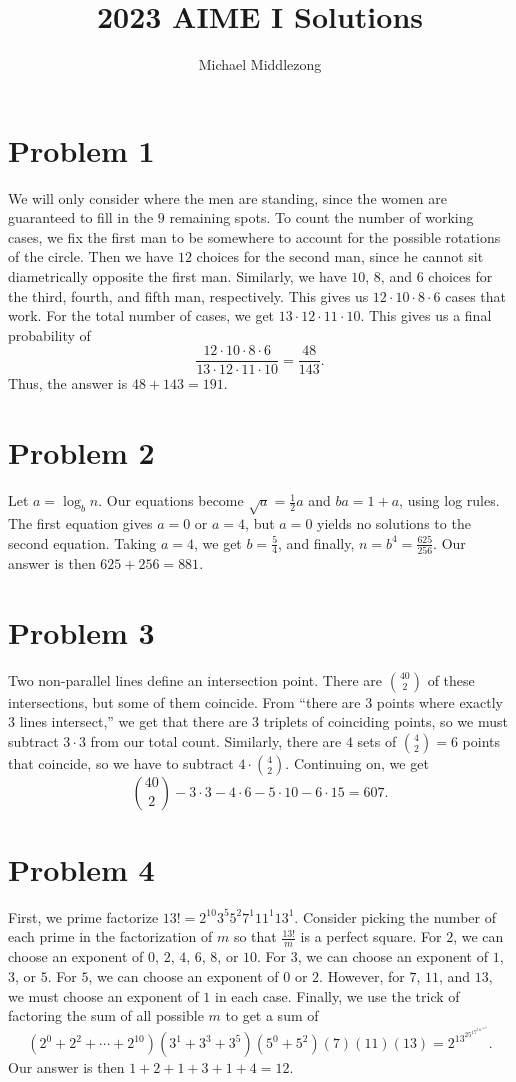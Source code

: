 \documentclass{scrartcl}
\title{2023 AIME I Solutions}
\author{Michael Middlezong}
\begin{document}
\maketitle

\section*{Problem 1}
We will only consider where the men are standing, since
the women are guaranteed to fill in the $9$ remaining spots.
To count the number of working cases, we fix the first man
to be somewhere to account for the possible rotations of the circle.
Then we have $12$ choices for the second man, since he cannot
sit diametrically opposite the first man. Similarly,
we have $10$, $8$, and $6$ choices for the third, fourth, and fifth man, respectively.
This gives us $12 \cdot 10 \cdot 8 \cdot 6$ cases that work.
For the total number of cases, we get $13 \cdot 12 \cdot 11 \cdot 10$.
This gives us a final probability of
\[ \frac{12 \cdot 10 \cdot 8 \cdot 6}{13 \cdot 12 \cdot 11 \cdot 10} = \frac{48}{143}. \]
Thus, the answer is $48 + 143 = \boxed{191}$.
\section*{Problem 2}
Let $a = \log_b n$. Our equations become $\sqrt{a} = \frac12 a$ and $ba = 1 + a$, using log rules.
The first equation gives $a=0$ or $a=4$, but $a=0$ yields no solutions to the second equation.
Taking $a=4$, we get $b = \frac54$, and finally, $n = b^4 = \frac{625}{256}$. Our answer is then
$625 + 256 = \boxed{881}$.
\section*{Problem 3}
Two non-parallel lines define an intersection point.
There are $\binom{40}{2}$ of these intersections, but some of them coincide.
From ``there are $3$ points where exactly $3$ lines intersect,''
we get that there are $3$ triplets of coinciding points,
so we must subtract $3 \cdot 3$ from our total count.
Similarly, there are $4$ sets of $\binom42 = 6$ points that coincide,
so we have to subtract $4 \cdot \binom42$.
Continuing on, we get
\[ \binom{40}{2} - 3\cdot 3 - 4\cdot 6 - 5\cdot 10 - 6\cdot 15 = \boxed{607}. \]
\section*{Problem 4}
First, we prime factorize $13! = 2^{10} 3^5 5^2 7^1 11^1 13^1$.
Consider picking the number of each prime in the factorization of $m$
so that $\frac{13!}{m}$ is a perfect square.
For $2$, we can choose an exponent of $0$, $2$, $4$, $6$, $8$, or $10$.
For $3$, we can choose an exponent of $1$, $3$, or $5$.
For $5$, we can choose an exponent of $0$ or $2$.
However, for $7$, $11$, and $13$, we must choose an exponent of $1$ in each case.
Finally, we use the trick of factoring the sum of all possible $m$ to get
a sum of
\[ (2^0 + 2^2 + \cdots + 2^{10})(3^1 + 3^3 + 3^5)(5^0 + 5^2)(7)(11)(13) = 2^13^25^17^311^113^4. \]
Our answer is then $1+2+1+3+1+4 = \boxed{12}$.
\end{document}
